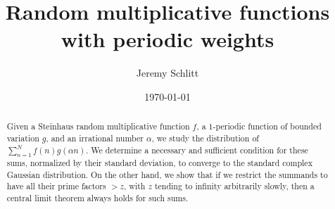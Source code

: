\documentclass[12pt]{amsart}
\numberwithin{equation}{section}
\theoremstyle{plain}
\theoremstyle{definition}
\begin{document}
	\title[random multiplicative functions with periodic weights]{Random multiplicative functions with periodic weights}
	\author[J. Schlitt]{Jeremy Schlitt}
	\address{D\'epartement de math\'ematiques et de statistique\\
		Universit\'e de Montr\'eal\\
		CP 6128 succ. Centre-Ville\\
		Montr\'eal, QC H3C 3J7\\
		Canada}
	\date{\today}
	\begin{abstract}
		Given a Steinhaus random multiplicative function $f$, a $1$-periodic function of bounded variation $g$, and an irrational number $\alpha$, we study the distribution of $\sum_{n=1}^N f(n) g(\alpha n)$. We determine a necessary and sufficient condition for these sums, normalized by their standard deviation, to converge to the standard complex Gaussian distribution. On the other hand, we show that if we restrict the summands to have all their prime factors  $>z$, with $z$ tending to infinity arbitrarily slowly, then a central limit theorem always holds for such sums.
	\end{abstract}
	\maketitle
\end{document}

